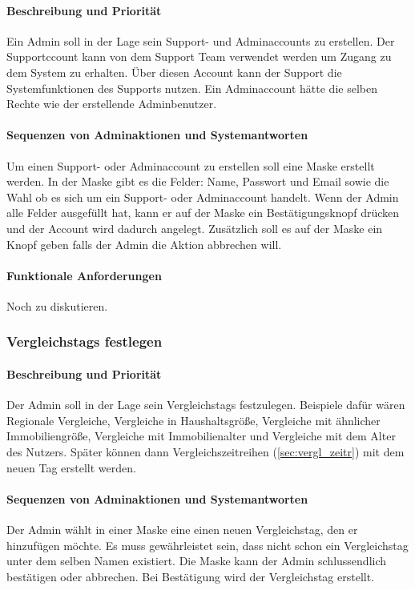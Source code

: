 \paragraph{Beschreibung und Priorität}
Ein Admin soll in der Lage sein Support- und Adminaccounts zu erstellen. Der Supportccount kann von dem Support Team verwendet werden um Zugang zu dem System zu erhalten. Über diesen Account kann der Support die Systemfunktionen des Supports nutzen. Ein Adminaccount hätte die selben Rechte wie der erstellende Adminbenutzer.
\paragraph{Sequenzen von Adminaktionen und Systemantworten}
Um einen Support- oder Adminaccount zu erstellen soll eine Maske erstellt werden. In der Maske gibt es die Felder: Name, Passwort und Email sowie die Wahl ob es sich um ein Support- oder Adminaccount handelt. Wenn der Admin alle Felder ausgefüllt hat, kann er auf der Maske ein Bestätigungsknopf drücken und der Account wird dadurch angelegt. Zusätzlich soll es auf der Maske ein  Knopf geben falls der Admin die Aktion abbrechen will.
\paragraph{Funktionale Anforderungen}
Noch zu diskutieren.

\subsubsection{Vergleichstags festlegen}\label{sec:vergl_tags}
\paragraph{Beschreibung und Priorität}
Der Admin soll in der Lage sein Vergleichstags festzulegen. 
Beispiele dafür wären Regionale Vergleiche, Vergleiche in Haushaltsgröße, Vergleiche mit ähnlicher Immobiliengröße, 
Vergleiche mit Immobilienalter und Vergleiche mit dem Alter des Nutzers. 
Später können dann Vergleichszeitreihen (\ref{sec:vergl_zeitr}) mit dem neuen Tag erstellt werden.
\paragraph{Sequenzen von Adminaktionen und Systemantworten}

Der Admin wählt in einer Maske eine einen neuen Vergleichstag, den er hinzufügen möchte.
Es muss gewährleistet sein, dass nicht schon ein Vergleichstag unter dem selben Namen existiert.
Die Maske kann der Admin schlussendlich bestätigen oder abbrechen.
Bei Bestätigung wird der Vergleichstag erstellt.
